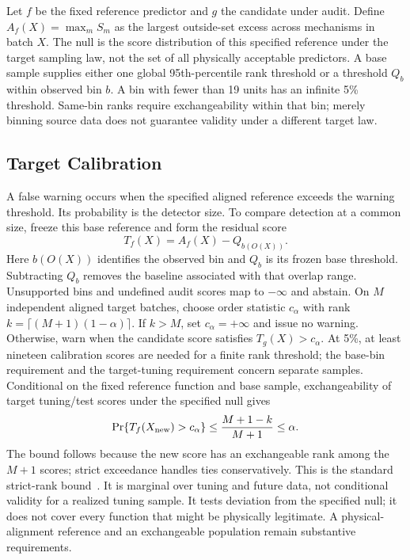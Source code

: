 \documentclass[conference]{IEEEtran}
\begin{document}
Let $f$ be the fixed reference predictor and $g$ the candidate under audit. Define $A_f(X)=\max_m S_m$ as the largest outside-set excess across mechanisms in batch $X$. The null is the score distribution of this specified reference under the target sampling law, not the set of all physically acceptable predictors. A base sample supplies either one global 95th-percentile rank threshold or a threshold $Q_b$ within observed bin $b$. A bin with fewer than 19 units has an infinite 5\% threshold. Same-bin ranks require exchangeability within that bin; merely binning source data does not guarantee validity under a different target law.

\subsection{Target Calibration}
A false warning occurs when the specified aligned reference exceeds the warning threshold. Its probability is the detector size. To compare detection at a common size, freeze this base reference and form the residual score
\begin{equation}
 T_f(X)=A_f(X)-Q_{b(O(X))}.
\end{equation}
Here $b(O(X))$ identifies the observed bin and $Q_b$ is its frozen base threshold. Subtracting $Q_b$ removes the baseline associated with that overlap range. Unsupported bins and undefined audit scores map to $-\infty$ and abstain. On $M$ independent aligned target batches, choose order statistic $c_\alpha$ with rank $k=\lceil(M+1)(1-\alpha)\rceil$. If $k>M$, set $c_\alpha=+\infty$ and issue no warning. Otherwise, warn when the candidate score satisfies $T_g(X)>c_\alpha$. At 5\%, at least nineteen calibration scores are needed for a finite rank threshold; the base-bin requirement and the target-tuning requirement concern separate samples. Conditional on the fixed reference function and base sample, exchangeability of target tuning/test scores under the specified null gives
\begin{equation}
 \Pr\{T_f(X_{\rm new})>c_\alpha\}\leq\frac{M+1-k}{M+1}\leq\alpha.
\end{equation}
The bound follows because the new score has an exchangeable rank among the $M+1$ scores; strict exceedance handles ties conservatively. This is the standard strict-rank bound~\cite{angelopoulos2023conformal}. It is marginal over tuning and future data, not conditional validity for a realized tuning sample. It tests deviation from the specified null; it does not cover every function that might be physically legitimate. A physical-alignment reference and an exchangeable population remain substantive requirements.
\end{document}
